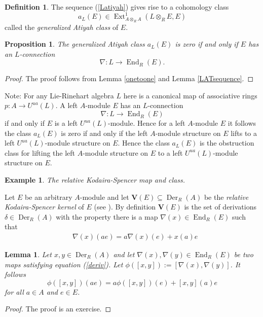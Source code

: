 \documentclass{amsart}
\theoremstyle{plain}
\newtheorem{lemma}[theorem]{Lemma}
\newtheorem{proposition}[theorem]{Proposition}
\newtheorem{example}[theorem]{Example}
\theoremstyle{definition}
\newtheorem{definition}[theorem]{Definition}
\theoremstyle{remark}
\numberwithin{equation}{theorem}
\begin{document}
\begin{definition} The sequence (\ref{Latiyah}) gives rise to a cohomology class
\[a_L(E)\in {\operatorname{Ext} }^1_{{A}\otimes_{R} {A}}(L\otimes_{R} E,E)\]
called the \emph{generalized Atiyah class} of $E$.
\end{definition}

\begin{proposition} \label{aclass} The generalized Atiyah class $a_L(E)$ is zero if and only if $E$ has an $L$-connection
\[\nabla:L\rightarrow {\operatorname{End} }_{R}(E).\]
\end{proposition}
\begin{proof}The proof follows from Lemma \ref{onetoone} and Lemma \ref{LATsequence}.
\end{proof}

Note: For any Lie-Rinehart algebra $L$ here is a canonical map of associative rings $p:{A}\rightarrow {U^{ua}}(L)$.
A left ${A}$-module $E$ has an $L$-connection 
\[ \nabla:L\rightarrow {\operatorname{End} }_{R}(E) \]
if and only if $E$ is a left ${U^{ua}}(L)$-module. Hence for a left ${A}$-module $E$ it follows 
the class $a_L(E)$ is zero if and only if the left ${A}$-module structure on $E$
lifts to a left ${U^{ua}}(L)$-module structure on $E$. Hence the class $a_L(E)$ is the obstruction class for lifting
the left ${A}$-module structure on $E$ to a left ${U^{ua}}(L)$-module structure on $E$.

\begin{example} The relative Kodaira-Spencer map and class.\end{example}

Let $E$ be an arbitrary ${A}$-module and let $\mathbf{V}(E)\subseteq {\operatorname{Der} }_{R}({A})$ be the \emph{relative Kodaira-Spencer kernel}
of $E$ (see \cite{maa1}). By definition $\mathbf{V}(E)$ is the set of derivations $\delta \in {\operatorname{Der} }_{R}({A})$ with the property 
there is
a map $\nabla(x)\in {\operatorname{End} }_{R}(E)$ such that 
\begin{align}
&\label{deriv}\nabla(x)(ae)=a\nabla(x)(e)+x(a)e
\end{align}

\begin{lemma} \label{lie} Let $x,y\in {\operatorname{Der} }_{R}({A})$ and let $\nabla(x), \nabla(y)\in {\operatorname{End} }_{R}(E)$ 
be two maps satisfying equation
(\ref{deriv}). Let $\phi([x,y]):=[\nabla(x),\nabla(y)]$. It follows
\[ \phi([x,y])(ae)=a\phi([x,y])(e)+[x,y](a)e\]
for all $a\in {A}$ and $e\in E$.
\end{lemma}
\begin{proof} The proof is an exercise.
\end{proof}
\end{document}

